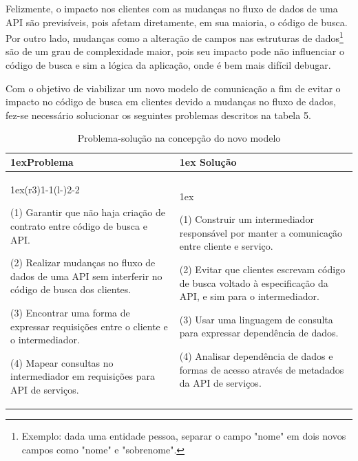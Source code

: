 Felizmente, o impacto nos clientes com as mudanças no fluxo de dados de uma API são previsíveis, pois afetam diretamente, em sua maioria, o código de busca. Por outro lado, mudanças como a alteração de campos nas estruturas de dados\footnote{
  Exemplo: dada uma entidade pessoa, separar o campo "nome" em dois novos campos como "nome" e "sobrenome".
} são de um grau de complexidade maior, pois seu impacto pode não influenciar o código de busca e sim a lógica da aplicação, onde é bem mais difícil debugar.

Com o objetivo de viabilizar um novo modelo de comunicação a fim de evitar o impacto no código de busca em clientes devido a mudanças no fluxo de dados, fez-se necessário solucionar os seguintes problemas descritos na tabela 5. \\

\begin{table}[H]
  \begin{tabularx}{\linewidth}{>{\parskip1ex}X@{\kern4\tabcolsep}>{\parskip1ex}X}
    \toprule
    \hfil\bfseries Problema
    &
    \hfil\bfseries Solução
    \\\cmidrule(r{3\tabcolsep}){1-1}\cmidrule(l{-\tabcolsep}){2-2}

    (1) Garantir que não haja criação de contrato entre código de busca e API.\par
    (2) Realizar mudanças no fluxo de dados de uma API sem interferir no código de busca dos clientes.\par
    (3) Encontrar uma forma de expressar requisições entre o cliente e o intermediador.\par
    (4) Mapear consultas no intermediador em requisições para API de serviços.\par

    &

    (1) Construir um intermediador responsável por manter a comunicação entre cliente e serviço.\par
	(2) Evitar que clientes escrevam código de busca voltado à especificação da API, e sim para o intermediador.\par
    (3) Usar uma linguagem de consulta para expressar dependência de dados.\par
    (4) Analisar dependência de dados e formas de acesso através de metadados da API de serviços.\par

\\\bottomrule
  \end{tabularx}
  \caption{Problema-solução na concepção do novo modelo}
\end{table}

